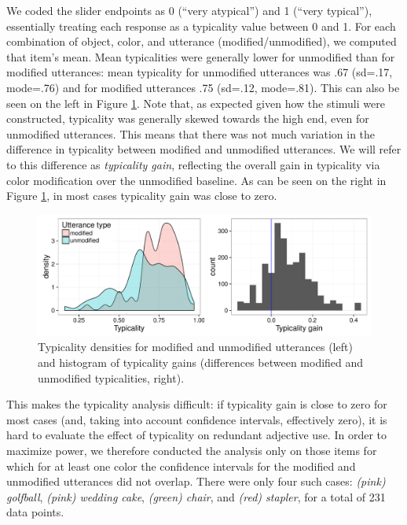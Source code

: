 \documentclass[11pt]{article}
\newcommand{\figref}[1]{Figure \ref{#1}}
\begin{document}
We coded the slider endpoints as 0 (``very atypical'') and 1 (``very typical''), essentially treating each response as a typicality value between 0 and 1. For each combination of object, color, and utterance (modified/unmodified), we computed that item's mean. Mean typicalities were generally lower for unmodified than for modified utterances: mean typicality for unmodified utterances was .67 (sd=.17, mode=.76) and for modified utterances .75 (sd=.12, mode=.81). This can also be seen on the left in \figref{fig:typicalitydists}. Note that, as expected given how the stimuli were constructed, typicality was generally skewed towards the high end, even for unmodified utterances. This means that there was not much variation in  the difference in typicality between modified and unmodified utterances. We will refer to this difference as \emph{typicality gain}, reflecting the overall gain in typicality via color modification over the unmodified baseline. As can be seen on the right in \figref{fig:typicalitydists}, in most cases typicality gain was close to zero.

\begin{figure}
\centering
\includegraphics[width=.9\textwidth]{pics/typicality-dists}
\caption{Typicality densities for modified and unmodified utterances (left) and histogram of typicality gains (differences between modified and unmodified typicalities, right).}
\label{fig:typicalitydists}
\end{figure}

This makes the typicality analysis difficult: if typicality gain is close to zero for most cases (and, taking into account confidence intervals, effectively zero), it is hard to evaluate the effect of typicality on redundant adjective use. In order to maximize power, we therefore conducted the analysis only on those items for which for at least one color the confidence intervals for the modified and unmodified utterances did not overlap. There were only four such cases: \emph{(pink) golfball}, \emph{(pink) wedding cake}, \emph{(green) chair}, and \emph{(red) stapler}, for a total of 231 data points.
\end{document}

